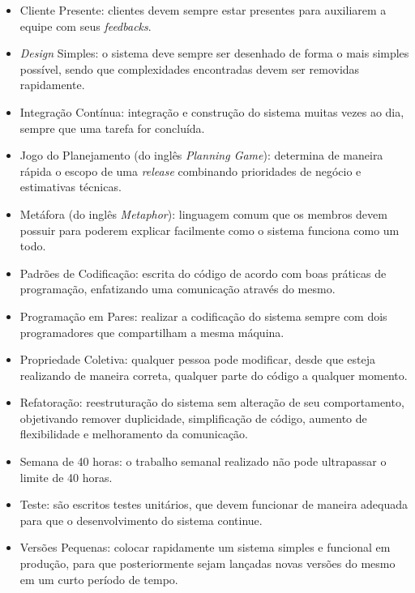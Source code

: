     \begin{itemize}
        \item Cliente Presente: clientes devem sempre estar presentes para auxiliarem a equipe com seus \textit{feedbacks}.
        \item \textit{Design} Simples: o sistema deve sempre ser desenhado de forma o mais simples possível, sendo que complexidades encontradas devem ser removidas rapidamente.
        \item Integração Contínua: integração e construção do sistema muitas vezes ao dia, sempre que uma tarefa
        for concluída.
        \item Jogo do Planejamento (do inglês \textit{Planning Game}): determina de maneira rápida o escopo de uma \textit{release} combinando prioridades de negócio e estimativas técnicas.
        \item Metáfora (do inglês \textit{Metaphor}): linguagem comum que os membros devem possuir para poderem explicar facilmente como o sistema funciona como um todo.
        \item Padrões de Codificação: escrita do código de acordo com boas práticas de programação, enfatizando uma comunicação através do mesmo.
        \item Programação em Pares: realizar a codificação do sistema sempre
        com dois programadores que compartilham a mesma máquina.
        \item Propriedade Coletiva: qualquer pessoa pode modificar, desde que esteja realizando de maneira correta, qualquer parte do código a qualquer momento.
        \item Refatoração: reestruturação do sistema sem alteração de seu comportamento, objetivando
        remover duplicidade, simplificação de código, aumento de flexibilidade e melhoramento da comunicação.
        \item Semana de 40 horas: o trabalho semanal realizado não pode ultrapassar o limite de 40 horas.
        \item Teste: são escritos testes unitários, que devem funcionar de maneira adequada para que
        o desenvolvimento do sistema continue.
        \item Versões Pequenas: colocar rapidamente um sistema simples e funcional em produção, para que posteriormente sejam lançadas novas versões do mesmo em um curto período de tempo.
    \end{itemize}

